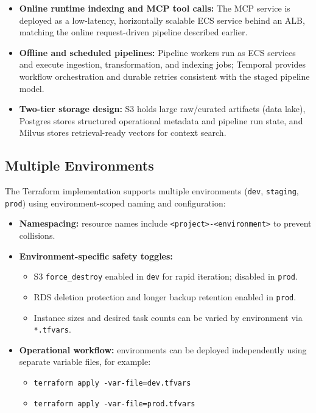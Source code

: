 \documentclass[a4paper,12pt]{article}
\begin{document}
\begin{itemize}[leftmargin=*]
    \item \textbf{Online runtime indexing and MCP tool calls:} The MCP service is deployed as a low-latency, horizontally scalable ECS service behind an ALB, matching the online request-driven pipeline described earlier.
    \item \textbf{Offline and scheduled pipelines:} Pipeline workers run as ECS services and execute ingestion, transformation, and indexing jobs; Temporal provides workflow orchestration and durable retries consistent with the staged pipeline model.
    \item \textbf{Two-tier storage design:} S3 holds large raw/curated artifacts (data lake), Postgres stores structured operational metadata and pipeline run state, and Milvus stores retrieval-ready vectors for context search.
\end{itemize}

\subsection{Multiple Environments}
The Terraform implementation supports multiple environments (\texttt{dev}, \texttt{staging}, \texttt{prod}) using environment-scoped naming and configuration:

\begin{itemize}[leftmargin=*]
    \item \textbf{Namespacing:} resource names include \texttt{<project>-<environment>} to prevent collisions.
    \item \textbf{Environment-specific safety toggles:}
    \begin{itemize}[leftmargin=*]
        \item S3 \texttt{force\_destroy} enabled in \texttt{dev} for rapid iteration; disabled in \texttt{prod}.
        \item RDS deletion protection and longer backup retention enabled in \texttt{prod}.
        \item Instance sizes and desired task counts can be varied by environment via \texttt{*.tfvars}.
    \end{itemize}
    \item \textbf{Operational workflow:} environments can be deployed independently using separate variable files, for example:
    \begin{itemize}[leftmargin=*]
        \item \texttt{terraform apply -var-file=dev.tfvars}
        \item \texttt{terraform apply -var-file=prod.tfvars}
    \end{itemize}
\end{itemize}
\end{document}
